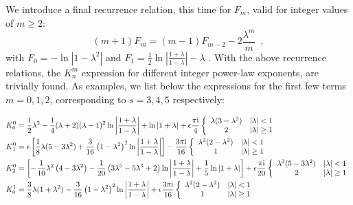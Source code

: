 \documentclass[a4paper,fleqn,usenatbib]{mnras}
\begin{document}
We introduce a final recurrence relation, this time for $F_m$, valid for integer values of $m\geq 2$:
\begin{equation}
\label{recurrenceL}
(m+1)F_{m} = (m-1)F_{m-2} - 2 \frac{\lambda^m}{m}\enspace ,
\end{equation}
with 
$F_0 = -\ln|1-\lambda^2|$ and $F_1=\frac{1}{2}\ln\left|\frac{1+\lambda}{1-\lambda} \right| -\lambda$ .
With the above recurrence relations, the $K_n^m$ expression for different integer power-law exponents, are trivially found. As examples, we list below the expressions for the first few terms $m=0,1,2$, corresponding to $s=3, 4, 5$ respectively:

\begin{align}
&K_0^0 =  \frac{1}{2} \lambda^2 -\frac{1}{4}(\lambda+2)(\lambda-1)^2\ln\left|\frac{1+\lambda}{1-\lambda} \right|
 + \ln \left| 1+\lambda \right| + \epsilon\frac{\pi {\rm i}}{4} \left\lbrace \begin{array}{cc}
  \lambda(3- \lambda^2) &  |\lambda| < 1 \\
2 &  |\lambda| \geq 1 
\end{array}\right.  \nonumber \\
&K_1^0 =  \epsilon\left[\frac{1}{8} \lambda(5-3\lambda^2) +\frac{3}{16} \left(1-\lambda^2\right)^2\ln\left|\frac{1+\lambda}{1-\lambda} \right| \right] - \frac{3\pi {\rm i}}{16} \left\lbrace \begin{array}{cc}
  \lambda^2(2- \lambda^2) &  |\lambda| < 1 \\
1 &  |\lambda| \geq 1 
\end{array}\right.  \nonumber \\
&K_2^0 =   \left[-\frac{1}{10}\lambda^2\left( 4 - 3\lambda^2\right) - \frac{1}{20} \left(3 \lambda^5-5 \lambda^3+2\right)\ln\left|\frac{1+\lambda}{1-\lambda} \right| +\frac{1}{5}\ln\left|1+\lambda \right| \right] + \epsilon\frac{ \pi {\rm i}}{20}  \left\lbrace \begin{array}{cc}
  \lambda^3(5- 3 \lambda^2) &  |\lambda|< 1 \\
2 & |\lambda| \geq 1 
\end{array}\right.  \nonumber \\
&K_0^1 =  \frac{3}{8} \lambda(1+\lambda^2) -\frac{3}{16} \left(1-\lambda^2\right)^2\ln\left|\frac{1+\lambda}{1-\lambda} \right| + \epsilon\frac{3\pi {\rm i}}{16} \left\lbrace \begin{array}{cc}
  \lambda^2(2- \lambda^2) &  |\lambda| < 1 \\
1 &  |\lambda| \geq 1 
\end{array}\right.  \nonumber \\

\end{align}
\end{document}
